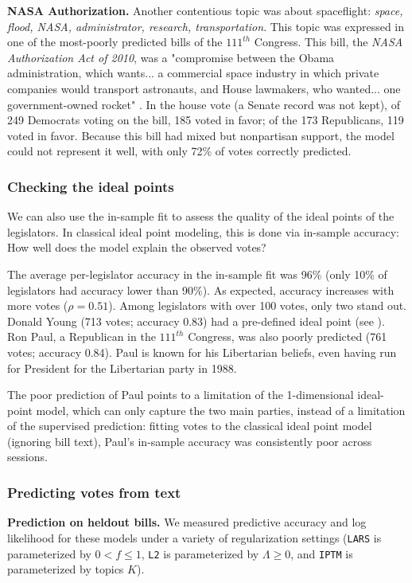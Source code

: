 \textbf{NASA Authorization.}
Another contentious topic was about spaceflight: \emph{space, flood,
NASA, administrator, research, transportation}.
This topic was expressed in one of the most-poorly predicted bills of
the $111^{th}$ Congress.  This bill, the \emph{NASA Authorization Act
of 2010}, was a "compromise between the Obama administration, which
wants... a commercial space industry in which private companies would
transport astronauts, and House lawmakers, who wanted... one
government-owned rocket" \citep{herszenhorn:2010}.  In the house vote
(a Senate record was not kept), of 249 Democrats voting on the bill,
185 voted in favor; of the 173 Republicans, 119 voted in favor.
Because this bill had mixed but nonpartisan support, the model could
not represent it well, with only 72\% of votes correctly predicted.

\subsubsection*{Checking the ideal points}
We can also use the in-sample fit to assess the quality of the ideal
points of the legislators.  In classical ideal point modeling, this is
done via in-sample accuracy: How well does the model explain the
observed votes?

The average per-legislator accuracy in the in-sample fit was 96\%
(only 10\% of legislators had accuracy lower than 90\%).  As expected,
accuracy increases with more votes ($\rho=0.51$).  Among legislators
with over 100 votes, only two stand out. Donald Young (713 votes;
accuracy 0.83) had a pre-defined ideal point (see ). Ron
Paul, a Republican in the $111^{th}$ Congress, was also poorly
predicted (761 votes; accuracy 0.84).  Paul is known for his
Libertarian beliefs, even having run for President for the Libertarian
party in 1988.

The poor prediction of Paul points to a limitation of the
1-dimensional ideal-point model, which can only capture the two main
parties, instead of a limitation of the supervised prediction: fitting
votes to the classical ideal point model (ignoring bill text), Paul's
in-sample accuracy was consistently poor across sessions.

\subsubsection*{Predicting votes from text}

\textbf{Prediction on heldout bills.}  We measured predictive accuracy
and log likelihood for these models under a variety of regularization
settings (\verb!LARS! is parameterized by $0 < f \le 1$, \verb!L2! is
parameterized by $\Lambda \ge 0$, and \verb!IPTM! is parameterized by
topics $K$).

